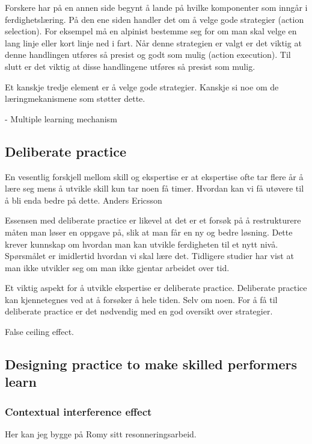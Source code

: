 \documentclass{report}
\begin{document}
Forskere har på en annen side begynt å lande på hvilke komponenter som inngår i ferdighetslæring. På den ene siden handler det om å velge gode strategier (action selection). For eksempel må en alpinist bestemme seg for om man skal velge en lang linje eller kort linje ned i fart. Når denne strategien er valgt er det viktig at denne handlingen utføres så presist og godt som mulig (action execution). Til slutt er det viktig at disse handlingene utføres så presist som mulig. 

Et kanskje tredje element er å velge gode strategier. Kanskje si noe om de læringmekanismene som støtter dette. 


- Multiple learning mechanism

\subsection{Deliberate practice}
En vesentlig forskjell mellom skill og ekspertise er at ekspertise ofte tar flere år å lære seg mens å utvikle skill kun tar noen få timer. Hvordan kan vi få utøvere til å bli enda bedre på dette. Anders Ericsson


Essensen med deliberate practice er likevel at det er et forsøk på å restrukturere måten man løser en oppgave på, slik at man får en ny og bedre løsning. Dette krever kunnskap om hvordan man kan utvikle ferdigheten til et nytt nivå. Spørsmålet er imidlertid hvordan vi skal lære det. Tidligere studier har vist at man ikke utvikler seg om man ikke gjentar arbeidet over tid. 

Et viktig aspekt for å utvikle ekspertise er deliberate practice. Deliberate practice kan kjennetegnes ved at å forsøker å hele tiden. Selv om noen. For å få til deliberate practice er det nødvendig med en god oversikt over strategier. 


False ceiling effect. 



\subsection{Designing practice to make skilled performers learn}


\subsubsection{Contextual interference effect}
Her kan jeg bygge på Romy sitt resonneringsarbeid. 
\end{document}
